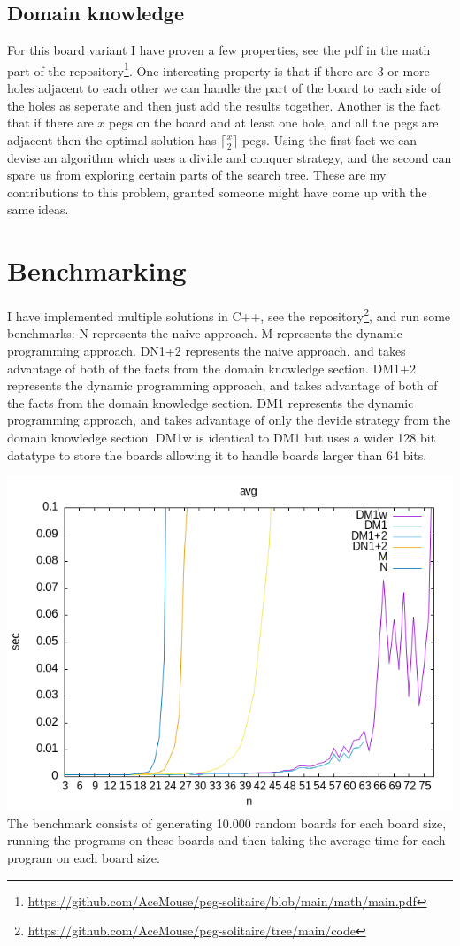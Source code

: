 \documentclass{article}
\begin{document}
\subsection{Domain knowledge}
For this board variant I have proven a few properties, see the pdf in the math part of the repository\footnote{\url{https://github.com/AceMouse/peg-solitaire/blob/main/math/main.pdf}}. One interesting property is that if there are 3 or more holes adjacent to each other we can handle the part of the board to each side of the holes as seperate and then just add the results together. Another is the fact that if there are $x$ pegs on the board and at least one hole, and all the pegs are adjacent then the optimal solution has $\lceil\frac{x}{2}\rceil$ pegs. Using the first fact we can devise an algorithm which uses a divide and conquer strategy, and the second can spare us from exploring certain parts of the search tree. These are my contributions to this problem, granted someone might have come up with the same ideas. 

\section{Benchmarking}
I have implemented multiple solutions in C++, see the repository\footnote{\url{https://github.com/AceMouse/peg-solitaire/tree/main/code}}, and run some benchmarks:
N represents the naive approach. 
M represents the dynamic programming approach. 
DN1+2 represents the naive approach, and takes advantage of both of the facts from the domain knowledge section. 
DM1+2 represents the dynamic programming approach, and takes advantage of both of the facts from the domain knowledge section. 
DM1 represents the dynamic programming approach, and takes advantage of only the devide strategy from the domain knowledge section. 
DM1w is identical to DM1 but uses a wider 128 bit datatype to store the boards allowing it to handle boards larger than 64 bits. 

\includegraphics[width=\textwidth]{./cpp_comparison_avg}
The benchmark consists of generating 10.000 random boards for each board size, running the programs on these boards and then taking the average time for each program on each board size.
\end{document}
